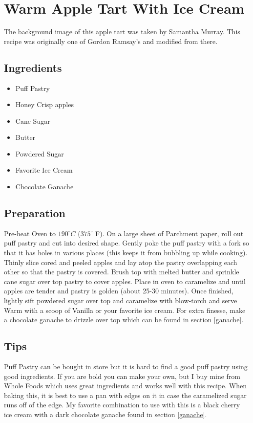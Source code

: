 \thispagestyle{fancy}
\section{Warm Apple Tart With Ice Cream} \label{appletart}
\AddToShipoutPicture*{\AppleTart}

The background image of this apple tart was taken by Samantha Murray. This recipe was originally one of Gordon Ramsay's and modified from there.

\subsection*{Ingredients}
\begin{multicols}{3}
	\begin{itemize}
		\item Puff Pastry
		\item Honey Crisp apples
		\item Cane Sugar
		\item Butter
		\item Powdered Sugar
		\item Favorite Ice Cream
		\item Chocolate Ganache
	\end{itemize}
\end{multicols}

\subsection*{Preparation}

Pre-heat Oven to $190^\circ C$ ($375^\circ$ F). On a large sheet of Parchment paper, roll out puff pastry and cut into desired shape. Gently poke the puff pastry with a fork so that it has holes in various places (this keeps it from bubbling up while cooking). Thinly slice cored and peeled apples and lay atop the pastry overlapping each other so that the pastry is covered. Brush top with melted butter and sprinkle cane sugar over top pastry to cover apples. Place in oven to caramelize and until apples are tender and pastry is golden (about 25-30 minutes). Once finished, lightly sift powdered sugar over top and caramelize with blow-torch and serve Warm with a scoop of Vanilla or your favorite ice cream. For extra finesse, make a chocolate ganache to drizzle over top which can be found in section \ref{ganache}.

\subsection*{Tips}

Puff Pastry can be bought in store but it is hard to find a good puff pastry using good ingredients. If you are bold you can make your own, but I buy mine from Whole Foods which uses great ingredients and works well with this recipe. When baking this, it is best to use a pan with edges on it in case the caramelized sugar runs off of the edge. My favorite combination to use with this is a black cherry ice cream with a dark chocolate ganache found in section \ref{ganache}.